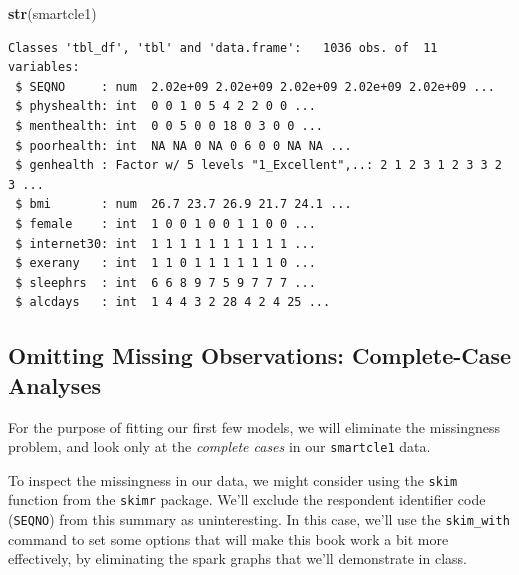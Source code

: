 \documentclass[]{book}
\newenvironment{Shaded}{\begin{snugshade}}{\end{snugshade}}
\newcommand{\KeywordTok}[1]{\textcolor[rgb]{0.13,0.29,0.53}{\textbf{#1}}}
\newcommand{\DataTypeTok}[1]{\textcolor[rgb]{0.13,0.29,0.53}{#1}}
\newcommand{\StringTok}[1]{\textcolor[rgb]{0.31,0.60,0.02}{#1}}
\newcommand{\OtherTok}[1]{\textcolor[rgb]{0.56,0.35,0.01}{#1}}
\newcommand{\OperatorTok}[1]{\textcolor[rgb]{0.81,0.36,0.00}{\textbf{#1}}}
\newcommand{\NormalTok}[1]{#1}
\theoremstyle{definition}
\theoremstyle{definition}
\theoremstyle{definition}
\theoremstyle{remark}
\begin{document}
\begin{Shaded}
\begin{Highlighting}[]
\KeywordTok{str}\NormalTok{(smartcle1)}
\end{Highlighting}
\end{Shaded}

\begin{verbatim}
Classes 'tbl_df', 'tbl' and 'data.frame':   1036 obs. of  11 variables:
 $ SEQNO     : num  2.02e+09 2.02e+09 2.02e+09 2.02e+09 2.02e+09 ...
 $ physhealth: int  0 0 1 0 5 4 2 2 0 0 ...
 $ menthealth: int  0 0 5 0 0 18 0 3 0 0 ...
 $ poorhealth: int  NA NA 0 NA 0 6 0 0 NA NA ...
 $ genhealth : Factor w/ 5 levels "1_Excellent",..: 2 1 2 3 1 2 3 3 2 3 ...
 $ bmi       : num  26.7 23.7 26.9 21.7 24.1 ...
 $ female    : int  1 0 0 1 0 0 1 1 0 0 ...
 $ internet30: int  1 1 1 1 1 1 1 1 1 1 ...
 $ exerany   : int  1 1 0 1 1 1 1 1 1 0 ...
 $ sleephrs  : int  6 6 8 9 7 5 9 7 7 7 ...
 $ alcdays   : int  1 4 4 3 2 28 4 2 4 25 ...
\end{verbatim}

\subsection{Omitting Missing Observations: Complete-Case
Analyses}\label{omitting-missing-observations-complete-case-analyses}

For the purpose of fitting our first few models, we will eliminate the
missingness problem, and look only at the \emph{complete cases} in our
\texttt{smartcle1} data.

To inspect the missingness in our data, we might consider using the
\texttt{skim} function from the \texttt{skimr} package. We'll exclude
the respondent identifier code (\texttt{SEQNO}) from this summary as
uninteresting. In this case, we'll use the \texttt{skim\_with} command
to set some options that will make this book work a bit more
effectively, by eliminating the spark graphs that we'll demonstrate in
class.

\begin{Shaded}
\end{Shaded}
\end{document}
